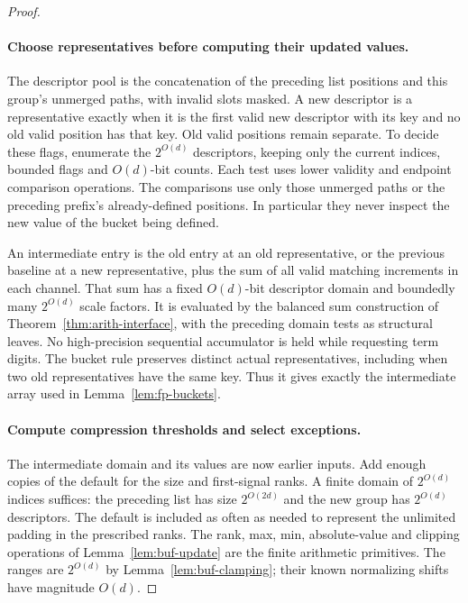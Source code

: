 \begin{proof}
\paragraph{Choose representatives before computing their updated values.}
The descriptor pool is the concatenation of the preceding list positions
and this group's unmerged paths, with invalid slots masked.  A new
descriptor is a representative exactly when it is the first valid
new descriptor with its key and no old valid position has that key.
Old valid positions remain separate.  To decide these flags, enumerate
the $2^{O(d)}$ descriptors, keeping only the current indices, bounded
flags and $O(d)$-bit counts.  Each test uses lower validity and endpoint
comparison operations.  The comparisons use only those unmerged paths
or the preceding prefix's already-defined positions.  In particular
they never inspect the new value of the bucket being defined.

An intermediate entry is the old entry at an old representative, or
the previous baseline at a new representative, plus the sum of all
valid matching increments in each channel.  That sum has a fixed
$O(d)$-bit descriptor domain and boundedly many $2^{O(d)}$ scale
factors.  It is evaluated by the balanced sum construction of
Theorem~\ref{thm:arith-interface}, with the preceding domain tests as
structural leaves.  No high-precision sequential accumulator is held
while requesting term digits.  The bucket rule preserves distinct
actual representatives, including when two old representatives have
the same key.  Thus it gives exactly the intermediate array used in
Lemma~\ref{lem:fp-buckets}.

\begingroup
{}
\paragraph{Compute compression thresholds and select exceptions.}
The intermediate domain and its values are now earlier inputs.  Add
enough copies of the default for the size and first-signal ranks.  A
finite domain of $2^{O(d)}$ indices suffices: the preceding list has
size $2^{O(2d)}$ and the new group has $2^{O(d)}$ descriptors.  The
default is included as often as needed to represent the unlimited
padding in the prescribed ranks.  The rank, max, min, absolute-value
and clipping operations of Lemma~\ref{lem:buf-update} are the finite
arithmetic primitives.  The ranges are $2^{O(d)}$ by
Lemma~\ref{lem:buf-clamping}; their known normalizing shifts have
magnitude $O(d)$.
\par\endgroup


\end{proof}
